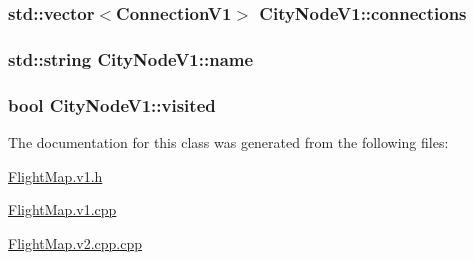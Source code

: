 \subsubsection[{\texorpdfstring{connections}{connections}}]{\setlength{\rightskip}{0pt plus 5cm}std\+::vector$<${\bf Connection\+V1}$>$ City\+Node\+V1\+::connections}\hypertarget{class_city_node_v1_a32793af0a49d5a187d88a1633f53b5c4}{}\label{class_city_node_v1_a32793af0a49d5a187d88a1633f53b5c4}
\subsubsection[{\texorpdfstring{name}{name}}]{\setlength{\rightskip}{0pt plus 5cm}std\+::string City\+Node\+V1\+::name}\hypertarget{class_city_node_v1_aadf0c50a4e35c15a8e13b51afefbdbc5}{}\label{class_city_node_v1_aadf0c50a4e35c15a8e13b51afefbdbc5}
\subsubsection[{\texorpdfstring{visited}{visited}}]{\setlength{\rightskip}{0pt plus 5cm}bool City\+Node\+V1\+::visited}\hypertarget{class_city_node_v1_adc01d952c831f5f740674e06940c4844}{}\label{class_city_node_v1_adc01d952c831f5f740674e06940c4844}


The documentation for this class was generated from the following files\+:\begin{DoxyCompactItemize}
\item 
\hyperlink{_flight_map_8v1_8h}{Flight\+Map.\+v1.\+h}\item 
\hyperlink{_flight_map_8v1_8cpp}{Flight\+Map.\+v1.\+cpp}\item 
\hyperlink{_flight_map_8v2_8cpp_8cpp}{Flight\+Map.\+v2.\+cpp.\+cpp}\end{DoxyCompactItemize}
